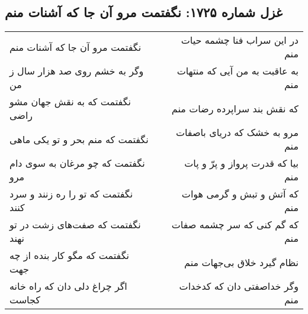 \begin{center}
\section*{غزل شماره ۱۷۲۵: نگفتمت مرو آن جا که آشنات منم}
\label{sec:1725}
\begin{longtable}{l p{0.5cm} r}
نگفتمت مرو آن جا که آشنات منم
&&
در این سراب فنا چشمه حیات منم
\\
وگر به خشم روی صد هزار سال ز من
&&
به عاقبت به من آیی که منتهات منم
\\
نگفتمت که به نقش جهان مشو راضی
&&
که نقش بند سراپرده رضات منم
\\
نگفتمت که منم بحر و تو یکی ماهی
&&
مرو به خشک که دریای باصفات منم
\\
نگفتمت که چو مرغان به سوی دام مرو
&&
بیا که قدرت پرواز و پرّ و پات منم
\\
نگفتمت که تو را ره زنند و سرد کنند
&&
که آتش و تبش و گرمی هوات منم
\\
نگفتمت که صفت‌های زشت در تو نهند
&&
که گم کنی که سر چشمه صفات منم
\\
نگفتمت که مگو کار بنده از چه جهت
&&
نظام گیرد خلاق بی‌جهات منم
\\
اگر چراغ دلی دان که راه خانه کجاست
&&
وگر خداصفتی دان که کدخدات منم
\\
\end{longtable}
\end{center}
